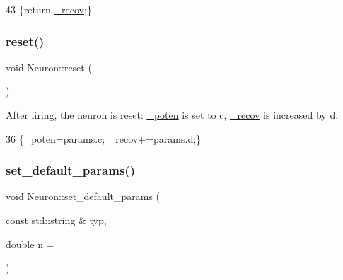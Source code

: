 \begin{DoxyCode}
43 \{\textcolor{keywordflow}{return} \hyperlink{classNeuron_a7bc9f5b85125f2c2596b64766796002b}{\_recov};\}
\end{DoxyCode}
\mbox{\label{classNeuron_a6817fc5bf2128150b41b65e74f018408}} 
\subsubsection{\texorpdfstring{reset()}{reset()}}
{\footnotesize\ttfamily void Neuron\+::reset (\begin{DoxyParamCaption}{ }\end{DoxyParamCaption})\hspace{0.3cm}{\ttfamily [inline]}}

After firing, the neuron is reset\+: \hyperlink{classNeuron_a7f7fdc3f9550b870351c60f618c11376}{\+\_\+poten} is set to {\ttfamily c}, \hyperlink{classNeuron_a7bc9f5b85125f2c2596b64766796002b}{\+\_\+recov} is increased by {\ttfamily d}. 
\begin{DoxyCode}
36 \{\hyperlink{classNeuron_a7f7fdc3f9550b870351c60f618c11376}{\_poten}=\hyperlink{classNeuron_a9427965b6669c7c35c327689de7a4d63}{params}.\hyperlink{structNeuronParams_a5df2ced2526eb84af2c8d2d34d9bfd93}{c}; \hyperlink{classNeuron_a7bc9f5b85125f2c2596b64766796002b}{\_recov}+=\hyperlink{classNeuron_a9427965b6669c7c35c327689de7a4d63}{params}.\hyperlink{structNeuronParams_af2bd3bad3bc5532186cdc8d056a10cfb}{d};\}
\end{DoxyCode}
\mbox{\label{classNeuron_a0759d03a357708ee4174f1bbb2b0b8d7}} 
\subsubsection{\texorpdfstring{set\+\_\+default\+\_\+params()}{set\_default\_params()}}
{\footnotesize\ttfamily void Neuron\+::set\+\_\+default\+\_\+params (\begin{DoxyParamCaption}\item[{const std\+::string \&}]{typ,  }\item[{double}]{n = {} }\end{DoxyParamCaption})}


